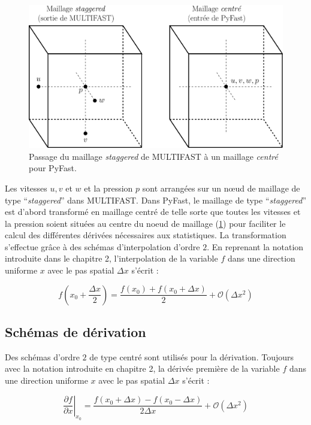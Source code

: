 \begin{figure}[!hbtp]
    \centering
    \includegraphics[width=0.7\linewidth]{Annexes/Pictures/Annexe1/node_PyFast.pdf}
    \caption{Passage du maillage \textit{staggered} de MULTIFAST à un maillage \textit{centré} pour PyFast.}
    \label{fig/node_PyFast}
\end{figure}

Les vitesses $u,v$ et $w$ et la pression $p$ sont arrangées sur un nœud de maillage de type \foreignquote{french}{\textit{staggered}} dans MULTIFAST. Dans PyFast, le maillage de type \foreignquote{french}{\textit{staggered}} est d'abord transformé en maillage centré de telle sorte que toutes les vitesses et la pression soient situées au centre du noeud de maillage (\cref{fig/node_PyFast}) pour faciliter le calcul des différentes dérivées nécessaires aux statistiques. La transformation s'effectue grâce à des schémas d'interpolation d'ordre $2$. En reprenant la notation introduite dans le chapitre 2, l'interpolation de la variable $f$ dans une direction uniforme $x$ avec le pas spatial $\Delta x$ s'écrit  :

\begin{equation}
    f \left( x_{0} + \frac{\Delta x}{2} \right) = \frac{f(x_{0})+f(x_{0}+\Delta x)}{2} + \mathcal{O}(\Delta x^{2})
\end{equation}

\subsection{Schémas de dérivation}

Des schémas d'ordre $2$ de type centré sont utilisés pour la dérivation. Toujours avec la notation introduite en chapitre 2, la dérivée première de la variable $f$ dans une direction uniforme $x$ avec le pas spatial $\Delta x$ s'écrit :

\begin{equation}
    \left. \frac{\partial f}{\partial x} \right|_{x_{0}} = \frac{f(x_{0}+\Delta x)-f(x_{0}-\Delta x)}{2 \Delta x} + \mathcal{O}(\Delta x^{2})
\end{equation}

